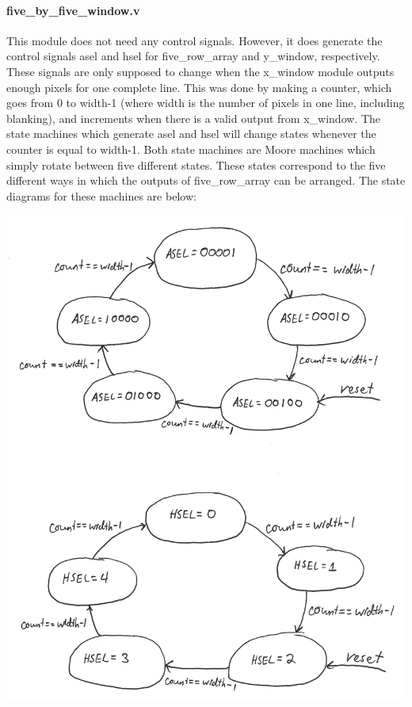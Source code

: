 \documentclass[12pt]{article}
\begin{document}
\paragraph{five\_by\_five\_window.v}
This module does not need any control signals. However, it does generate the 
control signals asel and hsel for five\_row\_array and y\_window, respectively. 
These signals are only supposed to change when the x\_window module outputs 
enough pixels for one complete line. This was done by making a counter, which 
goes from 0 to width-1 (where width is the number of pixels in one line, 
including blanking), and increments when there is a valid output from x\_window. 
The state machines which generate asel and hsel will change states whenever the 
counter is equal to width-1. Both state machines are Moore machines which simply 
rotate between five different states. These states correspond to the five 
different ways in which the outputs of five\_row\_array can be arranged. The state 
diagrams for these machines are below:


\includegraphics[width=\textwidth]{processed_image_pngs/sel_states.png}
\end{document}
